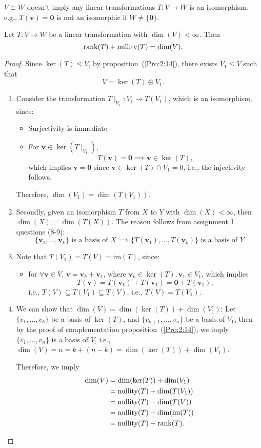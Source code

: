 \begin{remark}
$V\cong W$ doesn't imply any linear transformations $T:V\to W$ is an isomorphism. e.g., 
$T(\bm v)=\bm0$ is not an isomorphic if $W\ne\{\bm0\}$.
\end{remark}

\begin{theorem}\label{The:2:3}
Let $T:V\to W$ be a linear transformation with $\dim(V)<\infty$. Then
\[
\operatorname{rank}(T)+\text{nullity}(T)=\dim(V).
\]
\end{theorem}

\begin{proof}
Since $\ker(T)\le V$, by proposition~(\ref{Pro:2:14}), there exists  $V_1\le V$ such that 
\[
V=\ker(T)\oplus V_1.
\]
\begin{enumerate}
\item
Consider the transformation $T\mid_{V_1}:V_1\to T(V_1)$, which is an isomorphism, since:
\begin{itemize}
\item
Surjectivity is immediate
\item
For $\bm v\in\ker(T\mid_{V_1})$,
\[
T(\bm v)=\bm0\implies \bm v\in\ker(T),
\]
which implies $\bm v=\bm0$ since $\bm v\in\ker(T)\cap V_1=0$, i.e., the injectivity follows.
\end{itemize}
Therefore, $\dim(V_1)=\dim(T(V_1))$.
\item
Secondly, given an isomorphism $T$ from $X$ to $Y$ with $\dim(X)<\infty$, then $\dim(X)=\dim(T(X))$. The reason follows from assignment 1 questions (8-9):
\[
\{\bm v_1,\dots,\bm v_k\}\text{ is a basis of $X$}\implies
\{T(\bm v_1),\dots,T(\bm v_k)\}\text{ is a basis of $Y$}
\]
\item
Note that $T(V_1)=T(V)=\text{im}(T)$, since:
\begin{itemize}
\item
for $\forall\bm v\in V$, $\bm v=\bm v_k+\bm v_1$, where $\bm v_k\in\ker(T),\bm v_1\in V_1$, which implies
\[
T(\bm v)=T(\bm v_k)+T(\bm v_1)=\bm0+T(\bm v_1),
\]
i.e., $T(V)\subseteq T(V_1)\subseteq T(V)$, i.e., $T(V)=T(V_1)$.
\end{itemize}
\item
We can show that $\dim(V)=\dim(\ker(T))+\dim(V_1)$:
Let $\{v_1,\dots,v_k\}$ be a basis of $\ker(T)$,
and $\{v_{k+1},\dots,v_n\}$ be a basis of $V_1$,
then by the proof of complementation proposition~(\ref{Pro:2:14}),
we imply $\{v_1,\dots,v_n\}$ is a basis of $V$, i.e., 
$\dim(V)=n=k+(n-k)=\dim(\ker(T))+\dim(V_1)$.

Therefore, we imply
\begin{align*}
\dim(V)&=\dim(\ker(T))+\dim(V_1)\\
&=\text{nullity}(T)+\dim(T(V_1))\\
&=\text{nullity}(T)+\dim(T(V))\\
&=\text{nullity}(T)+\dim(\text{im}(T))\\
&=\text{nullity}(T)+\operatorname{rank}(T).
\end{align*}
\end{enumerate}
\end{proof}













